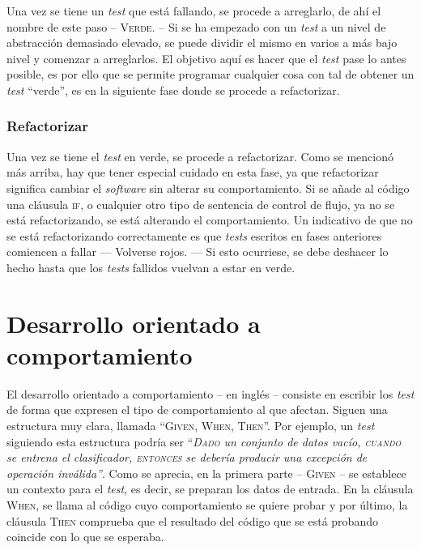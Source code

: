 Una vez se tiene un \emph{test} que está fallando, se procede a arreglarlo, de
ahí el nombre de este paso -- \textsc{Verde}. -- Si se ha empezado con un
\emph{test} a un nivel de abstracción demasiado elevado, se puede dividir el
mismo en varios a más bajo nivel y comenzar a arreglarlos. El objetivo aquí es
hacer que el \emph{test} pase lo antes posible, es por ello que se permite
programar cualquier cosa con tal de obtener un \emph{test} ``verde'', es en la
siguiente fase donde se procede a refactorizar.

\subsubsection{Refactorizar}
\label{sec:tddrefactor}

Una vez se tiene el \emph{test} en verde, se procede a refactorizar. Como se
mencionó más arriba, hay que tener especial cuidado en esta fase, ya que
refactorizar significa cambiar el \emph{software} sin alterar su
comportamiento. Si se añade al código una cláusula \textsc{if}, o cualquier otro
tipo de sentencia de control de flujo, ya no se está refactorizando, se está
alterando el comportamiento. Un indicativo de que no se está refactorizando
correctamente es que \emph{tests} escritos en fases anteriores comiencen a
fallar --- Volverse rojos. --- Si esto ocurriese, se debe deshacer lo hecho
hasta que los \emph{tests} fallidos vuelvan a estar en verde.

\section{Desarrollo orientado a comportamiento}
\label{sec:bdd}

El desarrollo orientado a comportamiento --  en inglés -- consiste en
escribir los \emph{test} de forma que expresen el tipo de comportamiento al que
afectan. Siguen una estructura muy clara, llamada ``\textsc{Given, When,
  Then}''. Por ejemplo, un \emph{test} siguiendo esta estructura podría ser
``\emph{\textsc{Dado} un conjunto de datos vacío, \textsc{cuando} se entrena el
  clasificador, \textsc{entonces} se debería producir una excepción de operación
  inválida''}. Como se aprecia, en la primera parte -- \textsc{Given} -- se
establece un contexto para el \emph{test}, es decir, se preparan los datos de
entrada.  En la cláusula \textsc{When}, se llama al código cuyo comportamiento
se quiere probar y por último, la cláusula \textsc{Then} comprueba que el
resultado del código que se está probando coincide con lo que se esperaba.

